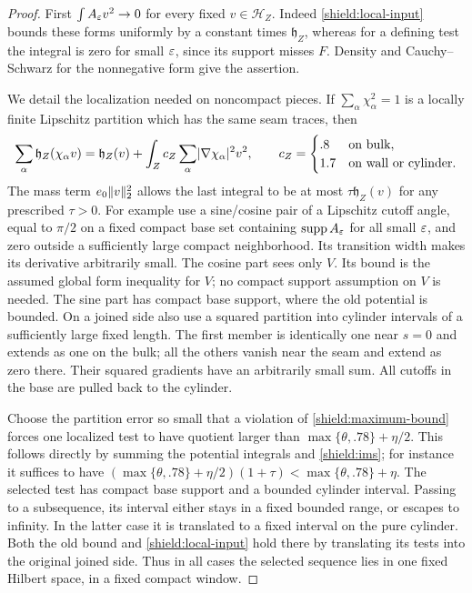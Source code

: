 \begin{proof}
First $\int A_\varepsilon v^2\to0$ for every fixed $v\in\mathcal H_Z$.
Indeed \cref{shield:local-input} bounds these forms uniformly by a
constant times $\mathfrak h_Z$, whereas for a defining test the integral
is zero for small $\varepsilon$, since its support misses $F$.  Density and
Cauchy--Schwarz for the nonnegative form give the assertion.

We detail the localization needed on noncompact pieces.  If
$\sum_\alpha\chi_\alpha^2=1$ is a locally finite Lipschitz partition
which has the same seam traces, then
\begin{equation}\label{shield:ims}
 \sum_\alpha\mathfrak h_Z(\chi_\alpha v)
 =\mathfrak h_Z(v)+
   \int_Z c_Z\sum_\alpha\lvert\nabla\chi_\alpha\rvert^2v^2,
 \qquad
 c_Z=\begin{cases}.8&\text{on bulk},\\1.7&\text{on wall or cylinder}.
 \end{cases}
\end{equation}
The mass term $e_0\lVert v\rVert_2^2$ allows the last integral to be at most
$\tau\mathfrak h_Z(v)$ for any prescribed $\tau>0$.  For example use a
sine/cosine pair of a Lipschitz cutoff angle, equal to $\pi/2$ on a
fixed compact base set containing $\operatorname{supp} A_\varepsilon$ for all small $\varepsilon$,
and zero outside a sufficiently large compact neighborhood.  Its transition width makes its derivative
arbitrarily small.  The cosine part sees only $V$. Its bound is the assumed global
form inequality for $V$; no compact support assumption on $V$ is needed.
The sine part has compact base support, where the old potential is bounded.
On a joined side
also use a squared partition into cylinder intervals of a sufficiently
large fixed length.  The first member is identically one near $s=0$
and extends as one on the bulk; all the others vanish near the seam
and extend as zero there.  Their squared gradients have an arbitrarily
small sum.  All cutoffs in the base are pulled back to the cylinder.

Choose the partition error so small that a violation of
\cref{shield:maximum-bound} forces one localized test to have quotient
larger than $\max\{\theta,.78\}+\eta/2$.  This follows directly by
summing the potential integrals and \cref{shield:ims}; for instance it
suffices to have
$(\max\{\theta,.78\}+\eta/2)(1+\tau)
 <\max\{\theta,.78\}+\eta$.
The selected test has compact base support and a bounded cylinder
interval.  Passing to a subsequence, its interval either stays in a
fixed bounded range, or escapes to infinity.  In the latter case it is
translated to a fixed interval on the pure cylinder.  Both the old
bound and \cref{shield:local-input} hold there by translating its tests
into the original joined side.  Thus in all cases the selected sequence
lies in one fixed Hilbert space, in a fixed compact window.


\end{proof}
